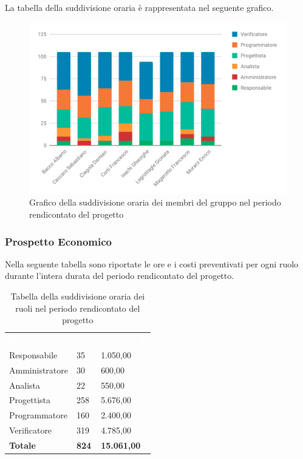 La tabella della suddivisione oraria è rappresentata nel seguente grafico.
\begin{figure}[H]
	\includegraphics[width=1\linewidth]{Preventivo/grafici/TR1_1.pdf}
	\caption{Grafico della suddivisione oraria dei membri del gruppo nel periodo rendicontato del progetto}
\end{figure}

\subsubsection{Prospetto Economico}
Nella seguente tabella sono riportate le ore e i costi preventivati per ogni ruolo durante l'intera durata del periodo rendicontato del progetto.


\begin{table}[H]	
	\begin{center}
	    \begin{tabular}{C{4cm}C{1cm}C{3,5cm}}
			\textcolor{white}{\textbf{Ruolo}} & \textcolor{white}{\textbf{Ore}} & \textcolor{white}{\textbf{Costo in €}}
			\\
			Responsabile & 35 & 1.050,00 \\
			Amministratore & 30 & 600,00 \\
			Analista & 22 & 550,00 \\
			Progettista & 258 & 5.676,00 \\
			Programmatore & 160 & 2.400,00 \\
			Verificatore & 319 & 4.785,00 \\
			\textbf{Totale} & \textbf{824} & \textbf{15.061,00} \\
		\end{tabular}
	    \caption{Tabella della suddivisione oraria dei ruoli nel periodo rendicontato del progetto} \label{tab:tabellaRuoliTotale} 
	\end{center}
\end{table}



